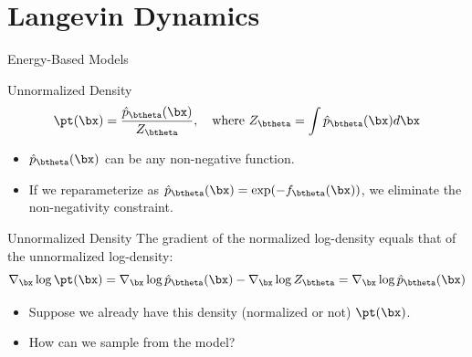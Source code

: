 \documentclass{beamer}
\begin{document}
\section{Langevin Dynamics}
\begin{frame}{Energy-Based Models}
	\begin{block}{Unnormalized Density}
		\vspace{-0.2cm}
		\[
			\pt(\bx) = \frac{\hat{p}_{\btheta}(\bx)}{Z_{\btheta}}, \quad \text{where } Z_{\btheta} = \int \hat{p}_{\btheta}(\bx) d \bx
		\]
		\vspace{-0.3cm}
		\begin{itemize}
			\item $\hat{p}_{\btheta}(\bx)$ can be any non-negative function. \\
			\item If we reparameterize as $\hat{p}_{\btheta}(\bx) = \exp(-f_{\btheta}(\bx))$, we eliminate the non-negativity constraint.
		\end{itemize}
	\end{block}
	\eqpause
	\vspace{-0.3cm}
	\begin{block}{Unnormalized Density}
		The gradient of the normalized log-density equals that of the unnormalized log-density:
		\[
			\nabla_{\bx} \log \pt(\bx) = \nabla_{\bx} \log \hat{p}_{\btheta}(\bx) - \nabla_{\bx} \log Z_{\btheta} = \nabla_{\bx} \log \hat{p}_{\btheta}(\bx)
		\]
	\end{block}
	\eqpause
	\vspace{-0.3cm}
	\begin{itemize}
		\item Suppose we already have this density (normalized or not) $\pt(\bx)$.
		\item How can we sample from the model?
	\end{itemize}
\end{frame}
\end{document}
